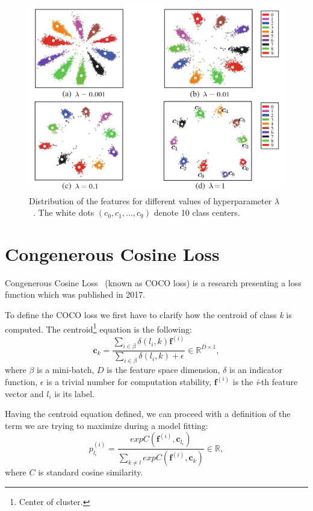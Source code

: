 \begin{figure}[H]
    \centering
    \includegraphics[width=\columnwidth]{images/losses/centerlosslambda.png}
    \caption{Distribution of the features for different values of hyperparameter $\lambda$~\cite{CenterLoss}.
    The white dots $(c_0,c_1,\dots,c_9)$ denote 10 class centers.}
    \label{fig:centerlosslambda}
\end{figure}

\section{Congenerous Cosine Loss}\label{sec:coco-loss}
Congenerous Cosine Loss~\cite{CocoLoss} (known as COCO loss) is a research presenting a loss function which was
published in 2017.

To define the COCO loss we first have to clarify how the centroid of class \textit{k} is computed.
The centroid\footnote{Center of cluster.} equation is the following:
\begin{equation}
    \boldsymbol{c}_{k} = \frac{\sum_{i \in \beta} \delta \left( l_i, k \right)\boldsymbol{f}^{(i)}}
    {\sum_{i \in \beta} \delta \left( l_i, k \right) + \epsilon} \in \mathbb{R}^{D \times 1},
\end{equation}
where $\beta$ is a mini-batch, $D$ is the feature space dimension, $\delta$ is an indicator function, $\epsilon$ is a
trivial number for computation stability, $\boldsymbol{f}^{(i)}$ is the \textit{i}-th feature vector and $l_i$ is
its label.

Having the centroid equation defined, we can proceed with a definition of the term we are trying to maximize during
a model fitting:
\begin{equation}
    p_{l_i}^{(i)} = \frac{exp C(\boldsymbol{f}^{(i)}, \boldsymbol{c}_{l_{i}})}
    {\sum_{k \neq l} exp C(\boldsymbol{f}^{(i)}, \boldsymbol{c}_{k})} \in \mathbb{R},
\end{equation}
where $C$ is standard cosine similarity.

